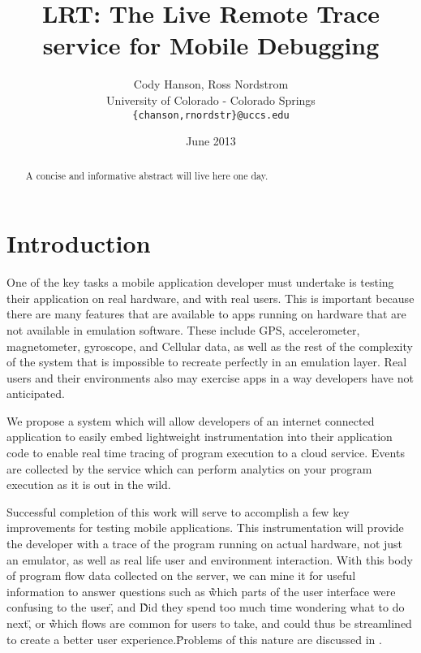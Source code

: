 \documentclass{acm_proc_article-sp}
\begin{document}
\title{LRT: The Live Remote Trace service for Mobile Debugging}
\author{Cody Hanson, Ross Nordstrom\\
        University of Colorado - Colorado Springs\\
        \texttt{\{chanson,rnordstr\}@uccs.edu}
       }
\date{June 2013}

\maketitle

\begin{abstract}
A concise and informative abstract will live here one day.
\end{abstract}

\section{Introduction}
One of the key tasks a mobile application developer must undertake is testing 
their application on real hardware, and with real users. This is important 
because there are many features that are available to apps running on hardware 
that are not available in emulation software. These include GPS, accelerometer, 
magnetometer, gyroscope, and Cellular data, as well as the rest of the 
complexity of the system that is impossible to recreate perfectly in an 
emulation layer. Real users and their environments also may exercise apps in
a way developers have not anticipated. 

We propose a system which will allow developers of an internet connected 
application to easily embed lightweight instrumentation 
into their application code to enable real 
time tracing of program execution to a cloud service. Events are collected by 
the service which can perform analytics on your program execution as it is out 
in the wild.

Successful completion of this work will serve to accomplish a few key 
improvements for testing mobile applications. This instrumentation will provide 
the developer with a trace of the program running on actual hardware, not just 
an emulator, as well as real life user and environment interaction. With this 
body of program flow data collected on the server, we can mine it for useful 
information to answer questions such as \`\`which parts of the user interface were 
confusing to the user\", and \`\`Did they spend too much time wondering what to do 
next\", or \`\`which flows are common for users to take, and could thus be 
streamlined to create a better user experience.\" Problems of this nature are 
discussed in \cite{WebAntiPattern}.
\end{document}
